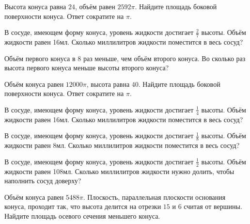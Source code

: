 \documentclass[a4paper]{article}
\begin{document}
\begin{taskBN}{15}
Высота конуса равна $24$, объём равен $2592\pi$. Найдите площадь боковой поверхности конуса. Ответ сократите на $\pi$.
\end{taskBN}

\begin{taskBN}{16}
В сосуде, имеющем форму конуса, уровень жидкости достигает $\frac{2}{7}$ высоты. Объём жидкости равен 16мл. Сколько миллилитров жидкости поместится в весь сосуд?
\end{taskBN}

\begin{taskBN}{17}
Объём первого конуса в 8 раз меньше, чем объём второго конуса. Во сколько раз высота первого конуса меньше высоты второго конуса?
\end{taskBN}

\begin{taskBN}{18}
Объём конуса равен $12000\pi$, высота равна $40$. Найдите площадь боковой поверхности конуса. Ответ сократите на $\pi$.
\end{taskBN}

\begin{taskBN}{19}
В сосуде, имеющем форму конуса, уровень жидкости достигает $\frac{1}{4}$ высоты. Объём жидкости равен 16мл. Сколько миллилитров жидкости поместится в весь сосуд?
\end{taskBN}

\begin{taskBN}{20}
В сосуде, имеющем форму конуса, уровень жидкости достигает $\frac{1}{8}$ высоты. Объём жидкости равен 8мл. Сколько миллилитров жидкости поместится в весь сосуд?
\end{taskBN}

\begin{taskBN}{21}
В сосуде, имеющем форму конуса, уровень жидкости достигает $\frac{1}{2}$ высоты. Объём жидкости равен 108мл. Сколько миллилитров жидкости нужно долить, чтобы наполнить сосуд доверху?
\end{taskBN}

\begin{taskBN}{22}
Объём конуса равен $5488\pi$. Плоскость, параллельная плоскости основания конуса,  проходит так, что высота делится на отрезки $15$ и $6$ считая от вершины. Найдите площадь осевого сечения меньшего конуса. 
\end{taskBN}
\end{document}
